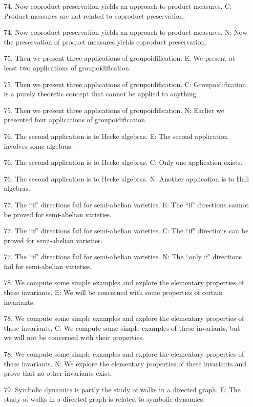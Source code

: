 74. Now coproduct preservation yields an approach to product measures.
C: Product measures are not related to coproduct preservation.

74. Now coproduct preservation yields an approach to product measures.
N: Now the preservation of product measures yields coproduct preservation. 

75. Then we present three applications of groupoidification.
E: We present at least two applications of groupoidification.

75. Then we present three applications of groupoidification.
C: Groupoidification is a purely theoretic concept that cannot be applied to anything.

75. Then we present three applications of groupoidification.
N: Earlier we presented four applications of groupoidification.

76. The second application is to Hecke algebras.
E: The second application involves some algebras.

76. The second application is to Hecke algebras.
C: Only one application exists.

76. The second application is to Hecke algebras.
N: Another application is to Hall algebras.

77. The ``if" directions fail for semi-abelian varieties.
E: The ``if" directions cannot be proved for semi-abelian varieties.

77. The ``if" directions fail for semi-abelian varieties.
C: The ``if" directions can be proved for semi-abelian varieties.

77. The ``if" directions fail for semi-abelian varieties.
N: The ``only if" directions fail for semi-abelian varieties.

78. We compute some simple examples and explore the elementary properties of these invariants.
E: We will be concerned with some properties of certain invariants.

78. We compute some simple examples and explore the elementary properties of these invariants.
C: We compute some simple examples of these invariants, but we will not be concerned with their properties.

78. We compute some simple examples and explore the elementary properties of these invariants.
N: We explore the elementary properties of these invariants and prove that no other invariants exist.

79. Symbolic dynamics is partly the study of walks in a directed graph.
E: The study of walks in a directed graph is related to symbolic dynamics.

